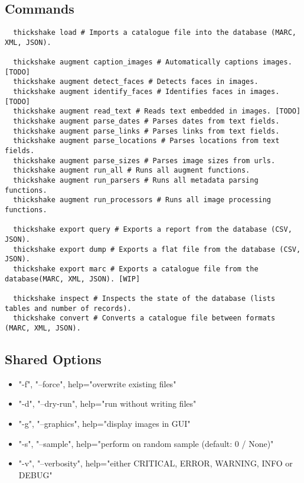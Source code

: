 \subsection{Commands}

\begin{verbatim}
  thickshake load # Imports a catalogue file into the database (MARC, XML, JSON).

  thickshake augment caption_images # Automatically captions images. [TODO]
  thickshake augment detect_faces # Detects faces in images.
  thickshake augment identify_faces # Identifies faces in images. [TODO]
  thickshake augment read_text # Reads text embedded in images. [TODO]
  thickshake augment parse_dates # Parses dates from text fields.
  thickshake augment parse_links # Parses links from text fields.
  thickshake augment parse_locations # Parses locations from text fields.
  thickshake augment parse_sizes # Parses image sizes from urls.
  thickshake augment run_all # Runs all augment functions.
  thickshake augment run_parsers # Runs all metadata parsing functions.
  thickshake augment run_processors # Runs all image processing functions.

  thickshake export query # Exports a report from the database (CSV, JSON).
  thickshake export dump # Exports a flat file from the database (CSV, JSON).
  thickshake export marc # Exports a catalogue file from the database(MARC, XML, JSON). [WIP]

  thickshake inspect # Inspects the state of the database (lists tables and number of records).
  thickshake convert # Converts a catalogue file between formats (MARC, XML, JSON).
\end{verbatim}

\subsection{Shared Options}

\begin{itemize}
  \item "-f", "--force", help="overwrite existing files"
  \item "-d", "--dry-run", help="run without writing files"
  \item "-g", "--graphics", help="display images in GUI"
  \item "-s", "--sample", help="perform on random sample (default: 0 / None)"
  \item "-v", "--verbosity", help="either CRITICAL, ERROR, WARNING, INFO or DEBUG"
\end{itemize}